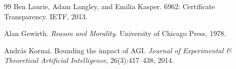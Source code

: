 \documentclass[11pt]{article}
\begin{document}
\begin{thebibliography}{99}
Ben Laurie, Adam Langley, and Emilia Kasper.
 6962: Certificate Transparency.
\newblock IETF, 2013.

Alan Gewirth.
\newblock \emph{Reason and Morality}.
\newblock University of Chicago Press, 1978.

Andr\'as Kornai.
\newblock Bounding the impact of AGI.
\newblock \emph{Journal of Experimental \& Theoretical Artificial
  Intelligence}, 26(3):417--438, 2014.

\end{thebibliography}
\end{document}
